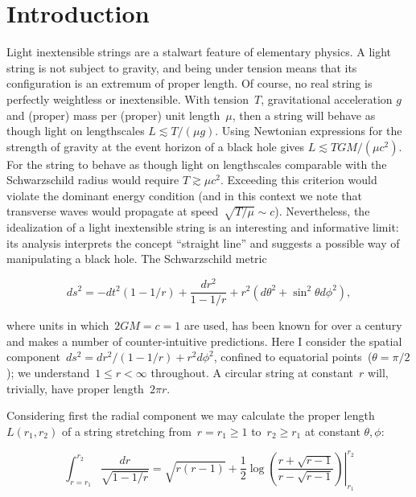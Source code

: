 \documentclass[times,twocolumn,final]{elsarticle}
\begin{document}
\section{Introduction}
\label{intro}
Light inextensible strings are a stalwart feature of elementary
physics.  A light string is not subject to gravity, and being under
tension means that its configuration is an extremum of proper length.
Of course, no real string is perfectly weightless or inextensible.
With tension~$T$, gravitational acceleration $g$ and (proper) mass per
(proper) unit length~$\mu$, then a string will behave as though light
on lengthscales $L\lesssim T/\left(\mu g\right)$.  Using Newtonian
expressions for the strength of gravity at the event horizon of a
black hole gives $L\lesssim TGM/\left(\mu c^2\right)$.  For the string
to behave as though light on lengthscales comparable with the
Schwarzschild radius would require $T\gtrsim\mu c^2$.  Exceeding this
criterion would violate the dominant energy condition (and in this
context we note that transverse waves would propagate at
speed~$\sqrt{T/\mu}\sim c$).  Nevertheless, the idealization of a
light inextensible string is an interesting and informative limit: its
analysis interprets the concept ``straight line'' and suggests a
possible way of manipulating a black hole.  The Schwarzschild metric

\begin{equation}\label{schwarzschild}
ds^2= -dt^2\left(1-1/r\right) +\frac{dr^2}{1-1/r} + r^2\left(d\theta^2 + \sin^2\theta d\phi^2\right),
\end{equation}

\noindent where units in which~$2GM=c=1$ are used, has been known for
over a century~\cite{schwarzschild1916} and makes a number of
counter-intuitive predictions.  Here I consider the spatial
component~$ds^2= dr^2/\left(1-1/r\right) + r^2d\phi^2$, confined to
equatorial points~($\theta=\pi/2$); we understand~$1\leq r<\infty$
throughout.  A circular string at constant~$r$ will, trivially, have
proper length~$2\pi r$.

Considering first the radial component we may calculate the
proper length $L\left(r_1,r_2\right)$ of a string stretching
from~$r=r_1\geq 1$ to~$r_2\geq r_1$ at constant $\theta,\phi$:

\begin{equation}\label{radial_string_length}
  \int_{r=r_1}^{r_2}\frac{dr}{\sqrt{1-1/r}}=
  \left.
  \sqrt{r(r-1)} +\frac{1}{2}\log\left(
  \frac{r+\sqrt{r-1}}{r-\sqrt{r-1}}\right)
  \right|_{r_1}^{r_2}
  \end{equation}
\end{document}
